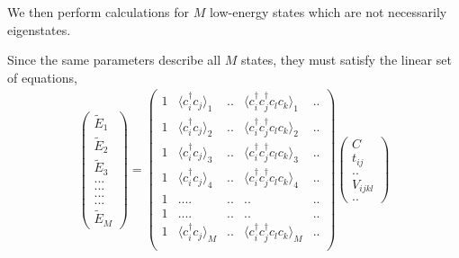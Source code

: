 \documentclass[aps, prb]{revtex4-1}
\begin{document}
We then perform calculations for $M$ low-energy states 
which are not necessarily eigenstates.  

 Since the same parameters describe all $M$ states, 
they must satisfy the linear set of equations, 
\begin{align}
\left(
\begin{array}{c}
\tilde{E}_1 \\
\tilde{E}_2 \\
\tilde{E}_3 \\
... \\
... \\
... \\
... \\
\tilde{E}_M
\end{array}
\right) =
\left(
\begin{array}{ccccc}
1 & \langle c_i^{\dagger}c_j \rangle_{1}  & .. & \langle c_i^{\dagger}c_j^{\dagger}c_l c_k \rangle_{1} & .. \\
1 & \langle c_i^{\dagger}c_j \rangle_{2}  & .. & \langle c_i^{\dagger}c_j^{\dagger}c_l c_k \rangle_{2} & .. \\
1 & \langle c_i^{\dagger}c_j \rangle_{3}  & .. & \langle c_i^{\dagger}c_j^{\dagger}c_l c_k \rangle_{3} & .. \\
1 & \langle c_i^{\dagger}c_j \rangle_{4}  & .. & \langle c_i^{\dagger}c_j^{\dagger}c_l c_k \rangle_{4} & .. \\
1 & ....                                  & .. & ..                                                    & .. \\
1 & ....                                  & .. & ..                                                    & .. \\
1 & \langle c_i^{\dagger}c_j \rangle_{M}  & .. & \langle c_i^{\dagger}c_j^{\dagger}c_l c_k \rangle_{M} & .. \\
\end{array}
\right) \left(
\begin{array}{c}
C           \\
t_{ij}      \\
..          \\
V_{ijkl}    \\
..
\end{array}
\right)
\label{eq:bigE_Ax}
\end{align}
\end{document}
